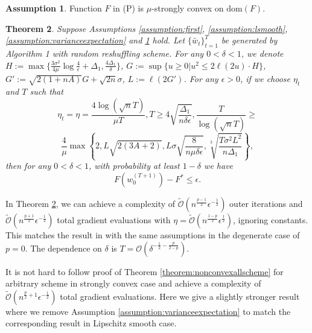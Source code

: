 \documentclass{article} %
\theoremstyle{plain}
\newtheorem{theorem}{Theorem}[section]
\theoremstyle{definition}
\newtheorem{assumption}[theorem]{Assumption}
\theoremstyle{remark}
\begin{document}
\begin{assumption}
\label{assumption:strongcon}
    Function $F$ in (P) is $\mu$-strongly convex on $\mathrm{dom}(F)$.
\end{assumption}

\begin{theorem}
\label{theorem:stronglyconvexrr}
    Suppose Assumptions \ref{assumption:first}, \ref{assumption:lsmooth}, \ref{assumption:varianceexpectation} and \ref{assumption:strongcon} hold. Let $\{\tilde{w_t}\}_{t=1}^T$ be generated by Algorithm 1 with random reshuffling scheme. For any $0<\delta<1$,  we denote $H:=\max\{\frac{3\sigma^2}{4\mu}\log\frac{4}{\epsilon}+\Delta_1, \frac{4\Delta_1}{\delta}\}$, $G:=\sup\{u\geq 0|u^2\leq 2\ell(2u)\cdot H\}$, $G':=\sqrt{2(1+nA)}G+\sqrt{2n}\sigma$, $L:=\ell(2G')$. For any $\epsilon>0$, if we choose $\eta_t$ and $T$ such that
    $$\eta_t=\eta=\frac{4\log(\sqrt{n}T)}{\mu T}, T\geq 4\sqrt{\frac{\Delta_1}{n\delta\epsilon}},\frac{T}{\log(\sqrt{n}T)}\geq$$ 
    $$ \frac{4}{\mu}\max\left\{2,L\sqrt{2(3A+2)},L\sigma\sqrt{\frac{8}{n\mu\delta\epsilon}},\sqrt[3]{\frac{T\sigma^2 L^2}{n\Delta_1}}\right\},$$
    then for any $0<\delta<1$, with probability at least $1-\delta$ we have
    $$F(w^{(T+1)}_0)-F^*\leq \epsilon.$$
\end{theorem}

In Theorem \ref{theorem:stronglyconvexrr}, we can achieve a complexity of $\widetilde{\mathcal{O}}\left(n^{\frac{p-1}{2}}\epsilon^{-\frac{1}{2}}\right)$ outer iterations and $\widetilde{\mathcal{O}}\left(n^{\frac{p+1}{2}}\epsilon^{-\frac{1}{2}}\right)$ total gradient evaluations with $\eta=\widetilde{\mathcal{O}}\left(n^{\frac{1-p}{2}}\epsilon^{\frac{1}{2}}\right)$, ignoring constants. This matches the result in \citet{nguyen2021unified} with the same assumptions in the degenerate case of $p=0$. The dependence on $\delta$ is $T=\mathcal{O}(\delta^{-\frac{1}{2}-\frac{p}{2-p}}).$


It is not hard to follow proof of Theorem \ref{theorem:nonconvexallscheme} for arbitrary scheme in strongly convex case and achieve a complexity of $\widetilde{\mathcal{O}}\left(n^{\frac{p}{2}+1}\epsilon^{-\frac{1}{2}}\right)$ total gradient evaluations. Here we give a slightly stronger result where we remove Assumption \ref{assumption:varianceexpectation} to match the corresponding result in Lipschitz smooth case.
\end{document}
